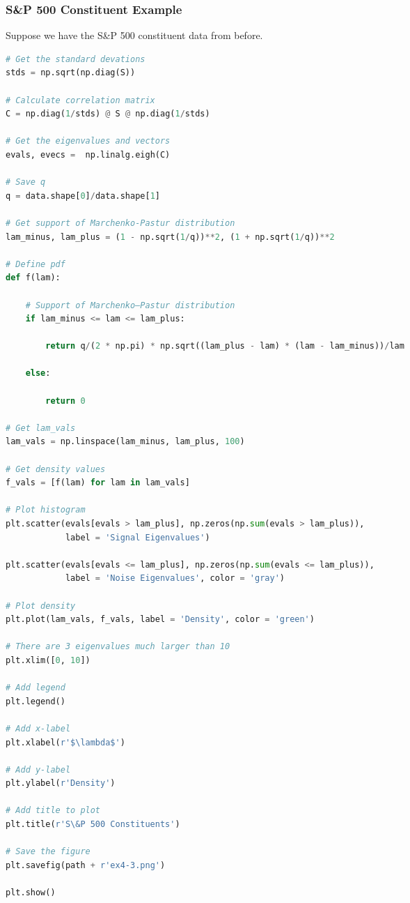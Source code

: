\documentclass{beamer}
\begin{document}
\begin{frame}[fragile]
\frametitle{S\&P 500 Constituent Example}
Suppose we have the S\&P 500 constituent data from before.
\begin{multicols}{2}
\begin{lstlisting}[language=Python]
# Get the standard devations
stds = np.sqrt(np.diag(S))

# Calculate correlation matrix
C = np.diag(1/stds) @ S @ np.diag(1/stds)

# Get the eigenvalues and vectors
evals, evecs =  np.linalg.eigh(C)

# Save q
q = data.shape[0]/data.shape[1]

# Get support of Marchenko-Pastur distribution
lam_minus, lam_plus = (1 - np.sqrt(1/q))**2, (1 + np.sqrt(1/q))**2 
        
# Define pdf
def f(lam):
    
    # Support of Marchenko–Pastur distribution
    if lam_minus <= lam <= lam_plus:
    
        return q/(2 * np.pi) * np.sqrt((lam_plus - lam) * (lam - lam_minus))/lam
                
    else:
        
        return 0
    
# Get lam_vals
lam_vals = np.linspace(lam_minus, lam_plus, 100)

# Get density values
f_vals = [f(lam) for lam in lam_vals]

# Plot histogram
plt.scatter(evals[evals > lam_plus], np.zeros(np.sum(evals > lam_plus)), 
            label = 'Signal Eigenvalues')

plt.scatter(evals[evals <= lam_plus], np.zeros(np.sum(evals <= lam_plus)), 
            label = 'Noise Eigenvalues', color = 'gray')

# Plot density
plt.plot(lam_vals, f_vals, label = 'Density', color = 'green')

# There are 3 eigenvalues much larger than 10
plt.xlim([0, 10])

# Add legend
plt.legend()

# Add x-label
plt.xlabel(r'$\lambda$')

# Add y-label
plt.ylabel(r'Density')

# Add title to plot
plt.title(r'S\&P 500 Constituents')

# Save the figure
plt.savefig(path + r'ex4-3.png')

plt.show()
\end{lstlisting}
\end{multicols}
\end{frame}
\end{document}

